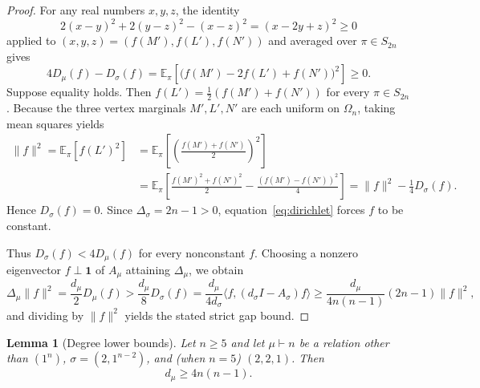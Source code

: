 \documentclass[11pt]{article}
\newtheorem{lemma}[theorem]{Lemma}
\theoremstyle{remark}
\newcommand{\E}{\mathbb{E}}
\newcommand{\one}{\mathbf{1}}
\begin{document}
\begin{proof}
For any real numbers $x, y, z$, the identity
\[
  2(x - y)^2 + 2(y - z)^2 - (x - z)^2 = (x - 2y + z)^2 \ge 0
\]
applied to $(x, y, z) = (f(M'), f(L'), f(N'))$ and averaged over $\pi \in S_{2n}$
gives
\[
  4 D_\mu(f) - D_\sigma(f)
  = \E_\pi\!\left[\bigl(f(M') - 2f(L') + f(N')\bigr)^2\right] \ge 0.
\]
Suppose equality holds. Then $f(L') = \frac{1}{2}(f(M') + f(N'))$ for every
$\pi \in S_{2n}$. Because the three vertex marginals $M', L', N'$ are each
uniform on $\Omega_n$, taking mean squares yields
\begin{align*}
  \|f\|^2 = \E_\pi[f(L')^2]
  &= \E_\pi\!\left[\left(\frac{f(M') + f(N')}{2}\right)^2\right] \\
  &= \E_\pi\!\left[\frac{f(M')^2 + f(N')^2}{2} - \frac{(f(M') - f(N'))^2}{4}\right]
   = \|f\|^2 - \frac{1}{4} D_\sigma(f).
\end{align*}
Hence $D_\sigma(f) = 0$. Since $\Delta_\sigma = 2n - 1 > 0$,
equation~\eqref{eq:dirichlet} forces $f$ to be constant.

Thus $D_\sigma(f) < 4 D_\mu(f)$ for every nonconstant $f$. Choosing a nonzero
eigenvector $f \perp \one$ of $A_\mu$ attaining $\Delta_\mu$, we obtain
\[
  \Delta_\mu \|f\|^2
  = \frac{d_\mu}{2} D_\mu(f)
  > \frac{d_\mu}{8} D_\sigma(f)
  = \frac{d_\mu}{4 d_\sigma} \langle f, (d_\sigma I - A_\sigma) f \rangle
  \ge \frac{d_\mu}{4 n(n-1)} (2n - 1) \|f\|^2,
\]
and dividing by $\|f\|^2$ yields the stated strict gap bound.
\end{proof}

\begin{lemma}[Degree lower bounds]\label{lem:degrees}
Let $n \ge 5$ and let $\mu \vdash n$ be a relation other than $(1^n)$,
$\sigma = (2, 1^{n-2})$, and (when $n = 5$) $(2, 2, 1)$. Then
\[
  d_\mu \ge 4 n(n-1).
\]
\end{lemma}
\end{document}
